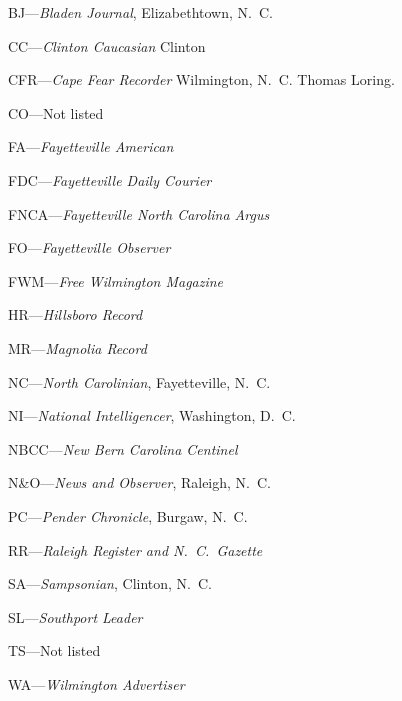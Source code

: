 \documentclass[11pt, a5paper, openright]{book}
\begin{document}
\begin{thebibliography}{99}
  BJ---\emph{Bladen Journal}, Elizabethtown, N.~C.

  CC---\emph{Clinton Caucasian} Clinton

  CFR---\emph{Cape Fear Recorder} Wilmington, N.~C.  Thomas Loring.

  CO---Not listed

  FA---\emph{Fayetteville American}

  FDC---\emph{Fayetteville Daily Courier}

  FNCA---\emph{Fayetteville North Carolina Argus}

  FO---\emph{Fayetteville Observer}

  FWM---\emph{Free Wilmington Magazine}

  HR---\emph{Hillsboro Record}

  MR---\emph{Magnolia Record}

  NC---\emph{North Carolinian}, Fayetteville, N.~C.

  NI---\emph{National Intelligencer}, Washington, D.~C.

  NBCC---\emph{New Bern Carolina Centinel}

  N\&O---\emph{News and Observer}, Raleigh, N.~C.

  PC---\emph{Pender Chronicle}, Burgaw, N.~C.

  RR---\emph{Raleigh Register and N.~C.~Gazette}

  SA---\emph{Sampsonian}, Clinton, N.~C.

  SL---\emph{Southport Leader}

  TS---Not listed

  WA---\emph{Wilmington Advertiser}


\end{thebibliography}
\end{document}
